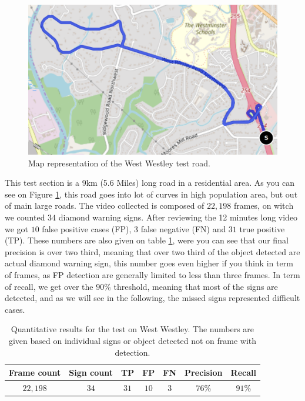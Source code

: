 \begin{figure}
    \centering
    \includegraphics[width=0.8\linewidth]{figures/westwestleymap.png}
    \caption{Map representation of the West Westley test road.}
    \label{fig:wwmap}
\end{figure}{}

This test section is a 9km (5.6 Miles) long road in a residential area. As you can see on Figure \ref{fig:wwmap}, this road goes into lot of curves in high population area, but out of main large roads. The video collected is composed of $22,198$ frames, on witch we counted $34$ diamond warning signs. After reviewing the 12 minutes long video we got $10$ false positive cases (FP), $3$ false negative (FN) and $31$ true positive (TP). These numbers are also given on table \ref{tab:ww_numbers}, were you can see that our final precision is over two third, meaning that over two third of the object detected are actual diamond warning sign, this number goes even higher if you think in term of frames, as FP detection are generally limited to less than three frames. In term of recall, we get over the $90\%$ threshold, meaning that most of the signs are detected, and as we will see in the following, the missed signs represented difficult cases.

\begin{table}[]
    \centering
    \caption{Quantitative results for the test on West Westley. The numbers are given based on individual signs or object detected not on frame with detection.}
    \begin{tabular}{|c|c|c|c|c|c|c|}
        \hline
        Frame count & Sign count & TP & FP & FN & Precision & Recall \\ \hline
        $22,198$ & $34$ & $31$ & $10$ & $3$ & $76\%$ & $91\%$ \\ \hline
    \end{tabular}
    \label{tab:ww_numbers}
\end{table}{}

